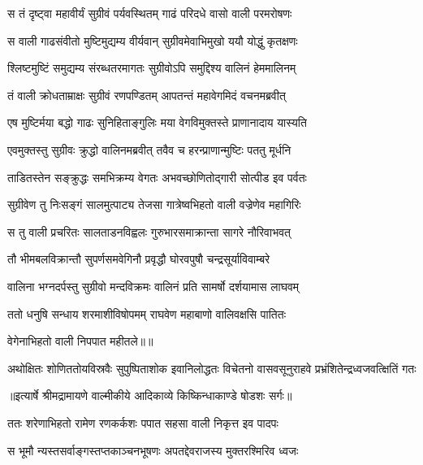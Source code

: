 \twolineshloka
{स तं दृष्ट्वा महावीर्यं सुग्रीवं पर्यवस्थितम्}
{गाढं परिदधे वासो वाली परमरोषणः} %

\twolineshloka
{स वाली गाढसंवीतो मुष्टिमुद्यम्य वीर्यवान्}
{सुग्रीवमेवाभिमुखो ययौ योद्धुं कृतक्षणः} %

\twolineshloka
{श्लिष्टमुष्टिं समुद्यम्य संरब्धतरमागतः}
{सुग्रीवोऽपि समुद्दिश्य वालिनं हेममालिनम्} %

\twolineshloka
{तं वाली क्रोधताम्राक्षः सुग्रीवं रणपण्डितम्}
{आपतन्तं महावेगमिदं वचनमब्रवीत्} %

\twolineshloka
{एष मुष्टिर्मया बद्धो गाढः सुनिहिताङ्गुलिः}
{मया वेगविमुक्तस्ते प्राणानादाय यास्यति} %

\twolineshloka
{एवमुक्तस्तु सुग्रीवः क्रुद्धो वालिनमब्रवीत्}
{तवैव च हरन्प्राणान्मुष्टिः पततु मूर्धनि} %

\twolineshloka
{ताडितस्तेन सङ्क्रुद्धः समभिक्रम्य वेगतः}
{अभवच्छोणितोद्गारी सोत्पीड इव पर्वतः} %

\twolineshloka
{सुग्रीवेण तु निःसङ्गं सालमुत्पाट्य तेजसा}
{गात्रेष्वभिहतो वाली वज्रेणेव महागिरिः} %

\twolineshloka
{स तु वाली प्रचरितः सालताडनविह्वलः}
{गुरुभारसमाक्रान्ता सागरे नौरिवाभवत्} %

\twolineshloka
{तौ भीमबलविक्रान्तौ सुपर्णसमवेगिनौ}
{प्रवृद्धौ घोरवपुषौ चन्द्रसूर्याविवाम्बरे} %

\twolineshloka
{वालिना भग्नदर्पस्तु सुग्रीवो मन्दविक्रमः}
{वालिनं प्रति सामर्षो दर्शयामास लाघवम्} %

\twolineshloka
{ततो धनुषि सन्धाय शरमाशीविषोपमम्}
{राघवेण महाबाणो वालिवक्षसि पातितः} %

{वेगेनाभिहतो वाली निपपात महीतले॥॥} %

\addtocounter{shlokacount}{1}

\fourlineindentedshloka
{अथोक्षितः शोणिततोयविस्रवैः}
{सुपुष्पिताशोक इवानिलोद्धतः}
{विचेतनो वासवसूनुराहवे}
{प्रभ्रंशितेन्द्रध्वजवत्क्षितिं गतः} %


{॥इत्यार्षे श्रीमद्रामायणे वाल्मीकीये आदिकाव्ये किष्किन्धाकाण्डे षोडशः सर्गः॥}


\twolineshloka
{ततः शरेणाभिहतो रामेण रणकर्कशः}
{पपात सहसा वाली निकृत्त इव पादपः} %

\twolineshloka
{स भूमौ न्यस्तसर्वाङ्गस्तप्तकाञ्चनभूषणः}
{अपतद्देवराजस्य मुक्तरश्मिरिव ध्वजः} %

